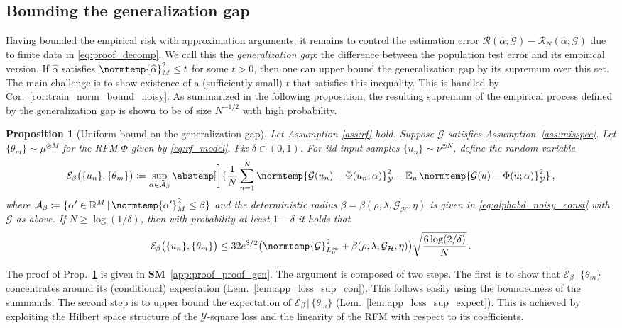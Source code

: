 \documentclass{article}
\theoremstyle{plain}
\newtheorem{proposition}[theorem]{Proposition}
\theoremstyle{my_def}
\theoremstyle{my_rem}
\numberwithin{equation}{section}
\numberwithin{theorem}{section}%
\newcommand{\R}{\mathbb{R}}
\newcommand{\E}{\mathbb{E}}
\newcommand{\scrR}{\mathscr{R}}
\newcommand{\cA}{\mathcal{A}}
\newcommand{\cE}{\mathcal{E}}
\newcommand{\cG}{\mathcal{G}}
\newcommand{\cH}{\mathcal{H}}
\newcommand{\cY}{\mathcal{Y}}
\newcommand{\norm}{\normtemp}
\newcommand{\abs}{\abstemp}
\renewcommand{\hat}{\widehat}
\newcommand{\defeq}{\coloneqq} %
\newcommand{\condbar}{\, \vert \,}
\renewcommand{\E}{\operatorname{\mathbb{E}}} %
\newcommand{\al}{\alpha}
\newcommand{\U}{{\{u_n\}}}
\newcommand{\Th}{{\{\theta_m\}}}
\newcommand{\GH}{\cG_{\cH}}
\newcommand{\alhat}{\hat{\al}}
\begin{document}
\subsection{Bounding the generalization gap}\label{sec:proof_gen}
Having bounded the empirical risk with approximation arguments, it remains to control the estimation error $\scrR(\alhat;\cG)-\scrR_N(\alhat;\cG)$ due to finite data in \eqref{eq:proof_decomp}. We call this the \emph{generalization gap}: the difference between the population test error and its empirical version. If $\alhat$ satisfies $\norm{\alhat}_M^2\leq t$ for some $t>0$, then one can upper bound the generalization gap by its supremum over this set. The main challenge is to show existence of a (sufficiently small) $t$ that satisfies this inequality. This is handled by Cor.~\ref{cor:train_norm_bound_noisy}. As summarized in the following proposition, the resulting supremum of the empirical process defined by the generalization gap is shown to be of size $N^{-1/2}$ with high probability.

\begin{proposition}[Uniform bound on the generalization gap]\label{prop:est_error_combined}
Let Assumption \ref{ass:rf} hold. Suppose $\cG$ satisfies Assumption~\ref{ass:misspec}. Let $\Th\sim\mu^{\otimes M}$ for the RFM $\Phi$ given by \eqref{eq:rf_model}. Fix $\delta\in(0,1)$. For iid input samples $\U\sim\nu^{\otimes N}$, define the random variable
    \begin{equation}
        \cE_\beta\bigl(\U,\Th\bigr)
        \defeq \sup_{\alpha\in\cA_\beta}\abs[\bigg]{\frac{1}{N}\sum_{n=1}^N\norm{\cG(u_n)-\Phi(u_n;\alpha)}_\cY^2 - \E_{u}\norm{\cG(u)-\Phi(u;\alpha)}_\cY^2}\,,
    \end{equation}
    where $\cA_\beta\defeq \{\alpha'\in\R^M\condbar  \norm{\alpha'}_M^2\leq \beta\}$ and the deterministic radius $\beta=\beta(\rho,\lambda,\GH,\eta)$ is given in \eqref{eq:alphabd_noisy_const} with $\cG$ as above. If $N\geq \log(1/\delta)$, then with probability at least $1-\delta$ it holds that
    \begin{equation}\label{eq:app_est_bdd}
        \cE_\beta\bigl(\U,\Th\bigr) \leq 32e^{3/2}\bigl(\norm{\cG}_{L_\nu^\infty}^2 + \beta(\rho,\lambda,\GH,\eta)\bigr)\sqrt{\frac{6\log(2/\delta)}{N}}\,.
    \end{equation}
\end{proposition}
The proof of Prop.~\ref{prop:est_error_combined} is given in {\bf SM}~\ref{app:proof_proof_gen}. The argument is composed of two steps. The first is to show that $\cE_\beta\condbar \Th$ concentrates around its (conditional) expectation (Lem.~\ref{lem:app_loss_sup_con}). This follows easily using the boundedness of the summands. The second step is to upper bound the expectation of $\cE_\beta\condbar \Th$ (Lem.~\ref{lem:app_loss_sup_expect}). This is achieved by exploiting the Hilbert space structure of the $\cY$-square loss and the linearity of the RFM with respect to its coefficients.
\end{document}
